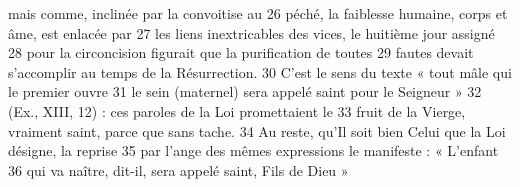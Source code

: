 mais comme, inclinée par la convoitise au	 
26	 	péché, la faiblesse humaine, corps et âme, est enlacée par	 
27	 	les liens inextricables des vices, le huitième jour assigné	 
28	 	pour la circoncision figurait que la purification de toutes	 
29	 	fautes devait s'accomplir au temps de la Résurrection.	 
30	 	C'est le sens du texte « tout mâle qui le premier ouvre	 
31	 	le sein (maternel) sera appelé saint pour le Seigneur »	 
32	 	(Ex., XIII, 12) : ces paroles de la Loi promettaient le	 
33	 	fruit de la Vierge, vraiment saint, parce que sans tache.	 
34	 	Au reste, qu'Il soit bien Celui que la Loi désigne, la reprise	 
35	 	par l'ange des mêmes expressions le manifeste : « L'enfant	 
36	 	qui va naître, dit-il, sera appelé saint, Fils de Dieu »